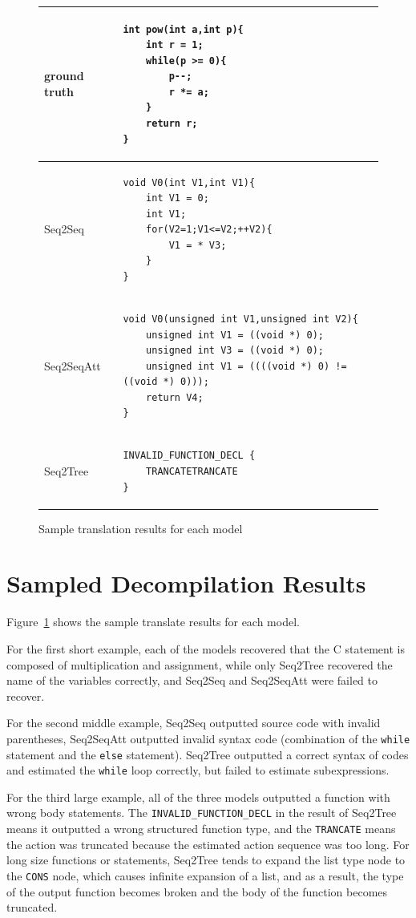 \documentclass[senior,final,11pt]{iscs-thesis}
\begin{document}
\begin{figure}
\begin{tabular}{|l|l|}
	 ground truth & 
		\begin{lstlisting}[style=Csample]
int pow(int a,int p){
	int r = 1;
	while(p >= 0){
		p--;
		r *= a;
	}
	return r;
}
		\end{lstlisting} \\ \hline
		Seq2Seq & 
		\begin{lstlisting}[style=Csample]
void V0(int V1,int V1){ 
	int V1 = 0; 
	int V1; 
	for(V2=1;V1<=V2;++V2){ 
		V1 = * V3; 
	} 
}
		\end{lstlisting} \\ \hline
		Seq2SeqAtt & 
		\begin{lstlisting}[style=Csample]
void V0(unsigned int V1,unsigned int V2){ 
	unsigned int V1 = ((void *) 0); 
	unsigned int V3 = ((void *) 0); 
	unsigned int V1 = ((((void *) 0) != ((void *) 0))); 
	return V4; 
}
	\end{lstlisting} \\ \hline
		Seq2Tree & 
		\begin{lstlisting}[style=Csample]
INVALID_FUNCTION_DECL { 
	TRANCATETRANCATE 
}
		\end{lstlisting}
		 \\ \hline	
	\end{tabular}
	\caption{Sample translation results for each model}
	\label{fig:sampletranse}
\end{figure}


\section{Sampled Decompilation Results}

Figure~\ref{fig:sampletranse} shows the sample translate results for each model.

For the first short example, each of the models recovered that the C statement is composed of multiplication and assignment,
while only Seq2Tree recovered the name of the variables correctly, and Seq2Seq and Seq2SeqAtt were failed to recover.

For the second middle example, Seq2Seq outputted source code with invalid parentheses, Seq2SeqAtt outputted invalid syntax code (combination of the \texttt{while} statement and the \texttt{else} statement).
Seq2Tree outputted a correct syntax of codes and estimated the \texttt{while} loop correctly, but failed to estimate subexpressions.

For the third large example, all of the three models outputted a function with wrong body statements.
The \texttt{INVALID\_FUNCTION\_DECL} in the result of Seq2Tree means it outputted a wrong structured function type, and the \texttt{TRANCATE} means 
the action was truncated because the estimated action sequence was too long. 
For long size functions or statements, Seq2Tree tends to expand the list type node to the \texttt{CONS} node, which causes infinite expansion of a list,
and as a result, the type of the output function becomes broken and the body of the function becomes truncated.
\end{document}
